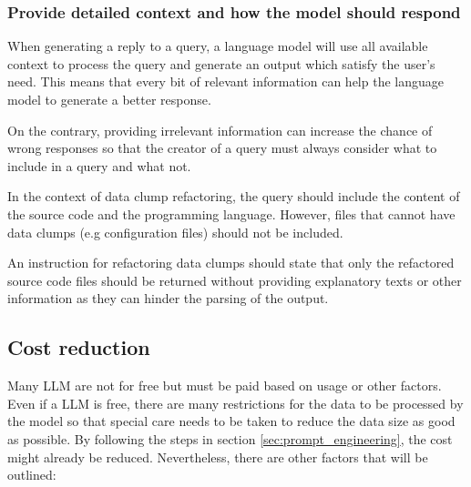 \subsubsection{Provide detailed context and how the model should respond}

When generating a reply to a query, a language model will use all available context to process the query and generate an output which satisfy the user's need. This means that every bit of relevant information can help the language model to generate a better response.

On the contrary, providing irrelevant information can increase the chance of wrong responses so that the creator of a query must always consider what to include in a query and what not. 

In the context of data clump refactoring, the query should include the content of the source code and the programming language. However, files that cannot have data clumps (e.g configuration files) should not be included.

An instruction for refactoring data clumps should state that only the refactored source code files should be returned without providing explanatory texts or other information as they can hinder the parsing of the output. 

\subsection{Cost reduction}

Many \ac{LLM} are not for free but must be paid based on usage or other factors. Even if a \ac{LLM} is free, there are many restrictions for the data to be processed by the model so that special care needs to be taken to reduce the data size as good as possible.  By following the steps in section \ref{sec:prompt_engineering}, the cost might already be reduced. Nevertheless, there are other factors that will be outlined:

